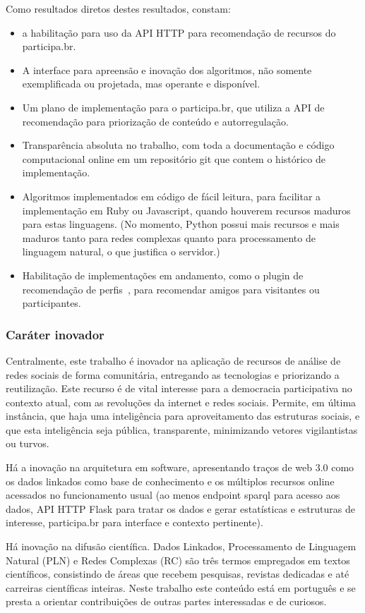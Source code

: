 \documentclass[12pt]{article}
\begin{document}
Como resultados diretos destes resultados, constam:
\begin{itemize}
    \item a habilitação para uso da API HTTP para recomendação de recursos do participa.br.
    \item A interface para apreensão e inovação dos algoritmos, não somente exemplificada ou projetada, mas operante e disponível.
    \item Um plano de implementação para o participa.br, que utiliza a API de recomendação para priorização de conteúdo e autorregulação.
    \item Transparência absoluta no trabalho, com toda a documentação e código computacional online em um repositório git que contem o histórico de implementação.
    \item Algoritmos implementados em código de fácil leitura, para facilitar a implementação em Ruby ou Javascript, quando houverem recursos maduros para estas linguagens. (No momento, Python possui mais recursos e mais maduros tanto para redes complexas quanto para processamento de linguagem natural, o que justifica o servidor.)
    \item Habilitação de implementações em andamento, como o plugin de recomendação de perfis~\cite{AIFeitosa}, para recomendar amigos para visitantes ou participantes. 
\end{itemize}
\subsubsection{Caráter inovador}
Centralmente, este trabalho é inovador na aplicação de recursos de análise de redes sociais de forma comunitária, entregando as tecnologias e priorizando a reutilização. Este recurso é de vital interesse para a democracia participativa no contexto atual, com as revoluções da internet e redes sociais. Permite, em última instância, que haja uma inteligência para aproveitamento das estruturas sociais, e que esta inteligência seja pública, transparente, minimizando vetores vigilantistas ou turvos.

Há a inovação na arquitetura em software, apresentando traços de web 3.0 como os dados linkados como base de conhecimento e os múltiplos recursos online acessados no funcionamento usual (ao menos endpoint sparql para acesso aos dados, API HTTP Flask para tratar os dados e gerar estatísticas e estruturas de interesse, participa.br para interface e contexto pertinente).

Há inovação na difusão científica. Dados Linkados, Processamento de Linguagem Natural (PLN) e Redes Complexas (RC) são três termos empregados em textos científicos, consistindo de áreas que recebem pesquisas, revistas dedicadas e até carreiras científicas inteiras. Neste trabalho este conteúdo está em português e se presta a orientar contribuições de outras partes interessadas e de curiosos.
\end{document}
